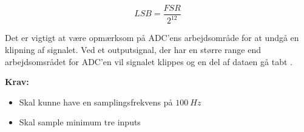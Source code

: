 \begin{equation} \label{equ:LSB}
LSB=\dfrac{FSR}{2^{12}}
\end{equation}


Det er vigtigt at være opmærksom på ADC'ens arbejdsområde for at undgå en klipning af signalet. Ved et outputsignal, der har en større range end arbejdsomsrådet for ADC'en vil signalet klippes og en del af dataen gå tabt \citep{webster1998, wolf2004}.

\vspace{3mm}
\textbf{Krav:}
\begin{itemize}
\item Skal kunne have en samplingsfrekvens på $100~Hz$
\item Skal sample minimum tre inputs 
\end{itemize}

